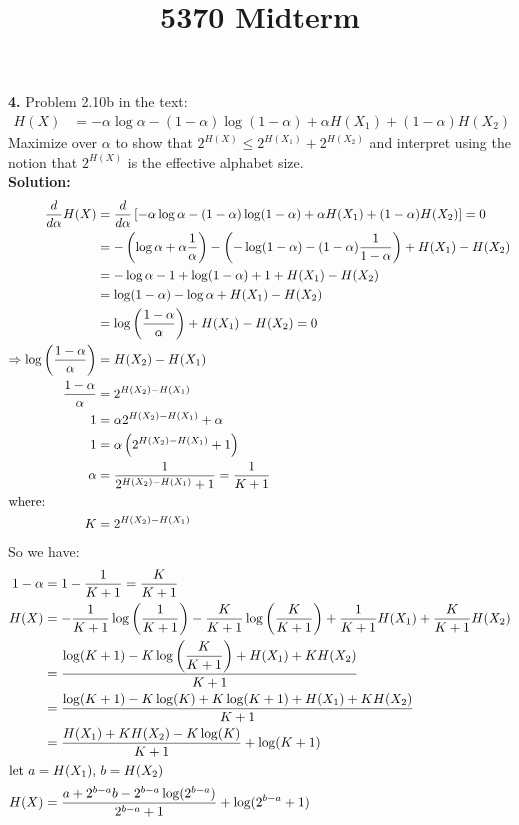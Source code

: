 \documentclass{assignment}
\title{5370 Midterm}
\begin{document}
\textbf{4.} Problem 2.10b in the text:\\
\begin{align*}
  H(X) & = -\alpha\log\alpha - (1 - \alpha)\log (1- \alpha) + \alpha H(X_1) + (1 - \alpha) H(X_2)
\end{align*}
Maximize over $\alpha$ to show that $2^{H(X)}\leq 2^{H(X_1)} + 2^{H(X_2) }$ and interpret using the notion that $2^{H(X)}$ is the effective alphabet size.\\

\textbf{Solution:} \\
\begin{align*}
  \dfrac{d}{d\alpha} H(X)
  & = \dfrac{d}{d\alpha}\left[ -\alpha\log\alpha - (1 - \alpha)\log (1- \alpha) + \alpha H(X_1) + (1 - \alpha) H(X_2)\right]
    = 0 \\
  & = -\left(\log \alpha + \alpha \dfrac{1}{\alpha}\right) - \left( - \log(1-\alpha) - (1-\alpha)\dfrac{1}{1-\alpha}\right)
      + H(X_1) - H(X_2)\\
  & =  -\log\alpha - 1 + \log(1-\alpha) + 1 + H(X_1) - H(X_2) \\
  & =  \log(1-\alpha) - \log\alpha + H(X_1) - H(X_2) \\
  & = \log\left( \dfrac{1 -\alpha}{\alpha} \right) + H(X_1) - H(X_2) = 0\\
  \Rightarrow \log\left( \dfrac{1 -\alpha}{\alpha} \right) & = H(X_2) - H(X_1) \\
  \dfrac{1 - \alpha}{\alpha} & = 2^{H(X_2) - H(X_1)} \\
  1 & = \alpha 2^{H(X_2) - H(X_1)} + \alpha\\
  1 & = \alpha \left( 2^{H(X_2) - H(X_1)} + 1 \right) \\
  \alpha & = \dfrac{1}{2^{H(X_2) - H(X_1)} + 1} = \dfrac{1}{K + 1} \\
  \shortintertext{where:}
  K & = 2^{H(X_2) - H(X_1)}
\end{align*}
So we have:
\begin{align*}
  1 - \alpha & = 1 - \dfrac{1}{K + 1} = \dfrac{K}{K + 1} \\
  H(X) & = - \dfrac{1}{K + 1} \log\left( \dfrac{1}{K + 1} \right) - \dfrac{K}{K + 1}\log\left( \dfrac{K}{K + 1} \right)
           + \dfrac{1}{K + 1} H(X_1) + \dfrac{K}{K + 1}H(X_2) \\
             & = \dfrac{\log(K + 1) - K\log\left( \dfrac{K}{K + 1} \right) + H(X_1) + K H(X_2)}{K + 1} \\
             & = \dfrac{\log(K + 1) - K\log(K) + K\log(K+1) + H(X_1) + K H(X_2)}{K + 1} \\
             & = \dfrac{H(X_1) +K H(X_2) - K\log(K)}{K+1} + \log(K+1) \\
  \shortintertext{let $a=H(X_1)$, $b=H(X_2)$}
  H(X) & = \dfrac{a +2^{b - a} b - 2^{b - a}\log(2^{b - a})}{2^{b - a}+1} + \log(2^{b - a}+1)
\end{align*}
\end{document}
